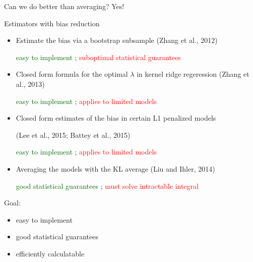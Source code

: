 \begin{frame}{Can we do better than averaging? Yes!}

Estimators with bias reduction
\begin{itemize}
%

\item
Estimate the bias via a bootstrap subsample (Zhang et al., 2012)

\textcolor{darkgreen}{easy to implement}
; 
\textcolor{red}{suboptimal statistical guarantees}

\item
Closed form formula for the optimal $\lambda$ in kernel ridge regeression (Zhang et al., 2013)

\textcolor{darkgreen}{easy to implement}
; 
\textcolor{red}{applies to limited models}

\item
Closed form estimates of the bias in certain L1 penalized models

(Lee et al., 2015; Battey et al., 2015)

\textcolor{darkgreen}{easy to implement}
; 
\textcolor{red}{applies to limited models}

\item
Averaging the models with the KL average (Liu and Ihler, 2014)

\textcolor{darkgreen}{good statistical guarantees}
; 
\textcolor{red}{must solve intractable integral}

\end{itemize}

\pause

Goal: 
\begin{itemize}
    \item easy to implement 
    \item good statistical guarantees 
    \item efficiently calculatable
\end{itemize}

%


%
%
%

\end{frame}


